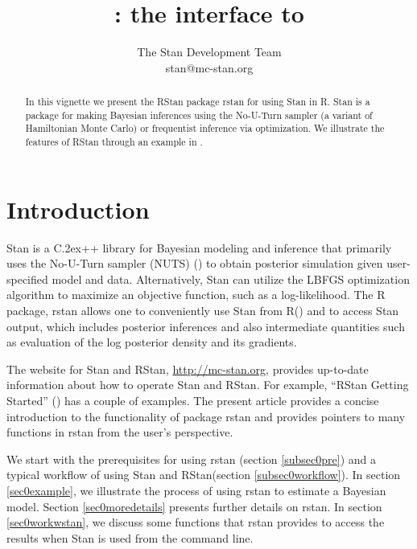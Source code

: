\documentclass[12pt]{article}
\title{\RStan: the \R interface to \Stan}
\author{The Stan Development Team \\ stan@mc-stan.org}
\newcommand{\R}{R\xspace}
\newcommand{\Stan}{Stan\xspace}
\newcommand{\RStan}{RStan\xspace}
\newcommand*{\Cpp}{C\raise.2ex\hbox{\footnotesize ++}\xspace} %
\newcommand{\strong}[1]{\texorpdfstring%
          {{\normalfont\fontseries{b}\selectfont #1}}%
            {#1}}
\let\pkg=\strong
\begin{document}
              
              \maketitle
              
              \tableofcontents
              
              \begin{abstract}
              In this vignette we present the \RStan package \pkg{rstan} for using Stan in \R. 
              \Stan is a package for making Bayesian inferences using the No-U-Turn sampler (a 
                                                                                             variant of Hamiltonian Monte Carlo) or frequentist inference via optimization. We 
              illustrate the features of \RStan through an example in \cite{GelmanCarlinSternRubin:2003}.
              \end{abstract}
              
              
              \section{Introduction}
              
              \Stan is a \Cpp library for Bayesian modeling and inference
              that primarily uses the No-U-Turn sampler (NUTS) (\citealt{hoffman-gelman:2012})
              to obtain posterior simulation given user-specified model and data. Alternatively,
              \Stan can utilize the LBFGS optimization algorithm to maximize an objective function,
              such as a log-likelihood. The \R package, \pkg{rstan} allows one to conveniently 
              use \Stan from \R (\citealt{rprj}) and to access \Stan output, which includes
              posterior inferences and also intermediate quantities such as evaluation
              of the log posterior density and its gradients. 
              
              The website for \Stan and \RStan, \url{http://mc-stan.org},
              provides up-to-date information about how to operate \Stan and \RStan.
              For example, ``\RStan Getting Started'' (\citealt{rstangettingstarted2012})
              has a couple of examples.  The present article provides 
              a concise introduction to the functionality of package \pkg{rstan} and
              provides pointers to many functions in \pkg{rstan} from the user's perspective.
              
              We start with the prerequisites for using \pkg{rstan} 
              (section \ref{subsec0pre}) and a typical workflow of using \Stan
              and \RStan (section \ref{subsec0workflow}). 
              In section \ref{sec0example}, we  illustrate the process 
              of using \pkg{rstan} to estimate a Bayesian model.
              Section \ref{sec0moredetails} presents further details on \pkg{rstan}. 
              In section \ref{sec0workwstan}, we discuss some functions that \pkg{rstan}
              provides to access the results when \Stan is used from the command line. 
              
\end{document}

